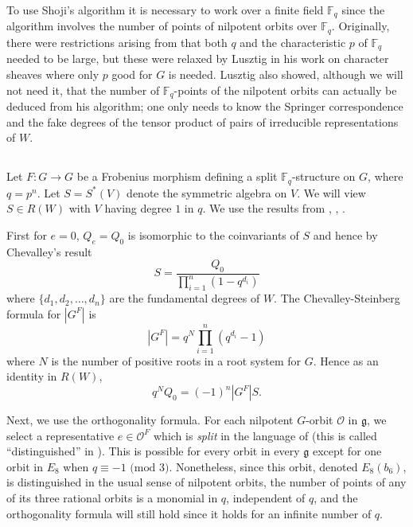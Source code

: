 \documentclass[10pt]{amsart}
\newcommand{\g}{\mathfrak{g}}
\newcommand{\orbit}{\mathcal O}
\newcommand{\F}{\mathbb F}
\theoremstyle{plain}
\theoremstyle{definition}
\theoremstyle{remark}
\begin{document}
To use Shoji's algorithm it is necessary to work over a finite field $\F_q$ since the algorithm involves the number of points of nilpotent orbits over 
$\F_q$.  Originally, there were restrictions arising from \cite{springer:green} that both $q$ and the characteristic $p$ of $\F_q$ needed to be large, 
but these were relaxed by Lusztig in his work on character sheaves \cite[Theorem 24.8]{lusztig:characterV} where only
$p$ good for $G$ is needed.  Lusztig also showed, although we will not need it, that the number of $\F_q$-points 
of the nilpotent orbits can actually be deduced from his algorithm; one only needs to know the Springer correspondence 
and the fake degrees of the tensor product of 
pairs of irreducible representations of $W$.   


\subsection{}
Let $F: G \to G$ be a Frobenius morphism defining a split $\F_q$-structure on $G$, where $q=p^n$.  
Let $S = S^*(V)$ denote the symmetric algebra on $V$.  We will view $S \in R(W)$ with $V$ having degree $1$ in $q$.
We use the results from \cite{shoji:green_f4}, \cite{shoji:green_classical}, \cite{bs:green}.%

First for $e=0$, $Q_e = Q_0$ is isomorphic to the coinvariants of $S$ and hence by Chevalley's result
$$S = \frac{Q_0}{\prod_{i=1}^n (1 - q^{d_i}) }$$
where $\{d_1, d_2, \dots, d_n\}$ are the fundamental degrees of $W$.
The Chevalley-Steinberg formula for $|G^F|$ is
$$|G^F| = q^N \prod_{i=1}^n (q^{d_i} -1)$$
where $N$ is the number of positive roots in a root system for $G$.  
Hence as an identity in $R(W)$,
\begin{equation} \label{harmonics}
q^{N} Q_0 =  (-1)^n |G^F| S.
\end{equation} 

Next, we use the orthogonality formula.  
For each nilpotent $G$-orbit $\orbit$ in $\g$, we select a representative $e \in \orbit^F$ which is {\it split} in the language of %
\cite{bs:green}
(this is called ``distinguished'' in  \cite{shoji:green_classical}).  This is possible for every orbit in every $\g$ except for one orbit in $E_8$ \cite{shoji:green_classical}\cite{bs:green}
when $q \equiv -1 \mbox{ (mod } 3)$.  Nonetheless, since this orbit, denoted $E_8(b_6)$, is distinguished in the usual sense of nilpotent orbits, the number of points of any of its three rational orbits is a monomial in $q$, independent of  $q$, and the orthogonality formula will still hold since it holds for an infinite number of $q$.
\end{document}

